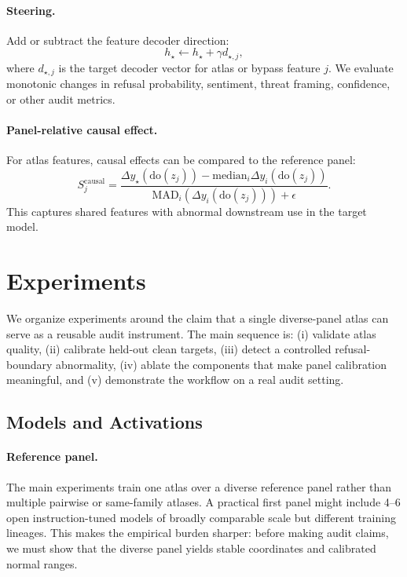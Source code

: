 \documentclass[11pt]{article}
\newcommand{\mad}{\mathrm{MAD}}
\begin{document}
\paragraph{Steering.}
Add or subtract the feature decoder direction:
\begin{equation}
    h_\star \leftarrow h_\star + \gamma d_{\star,j},
\end{equation}
where $d_{\star,j}$ is the target decoder vector for atlas or bypass feature $j$. We evaluate monotonic changes in refusal probability, sentiment, threat framing, confidence, or other audit metrics.

\paragraph{Panel-relative causal effect.}
For atlas features, causal effects can be compared to the reference panel:
\begin{equation}
    S^{\mathrm{causal}}_j=
    \frac{\Delta y_\star(\mathrm{do}(z_j))-\mathrm{median}_i\Delta y_i(\mathrm{do}(z_j))}{\mad_i(\Delta y_i(\mathrm{do}(z_j)))+\epsilon}.
\end{equation}
This captures shared features with abnormal downstream use in the target model.

\section{Experiments}

We organize experiments around the claim that a single diverse-panel atlas can serve as a reusable audit instrument. The main sequence is: (i) validate atlas quality, (ii) calibrate held-out clean targets, (iii) detect a controlled refusal-boundary abnormality, (iv) ablate the components that make panel calibration meaningful, and (v) demonstrate the workflow on a real audit setting.

\subsection{Models and Activations}

\paragraph{Reference panel.}
The main experiments train one atlas over a diverse reference panel rather than multiple pairwise or same-family atlases. A practical first panel might include 4--6 open instruction-tuned models of broadly comparable scale but different training lineages. This makes the empirical burden sharper: before making audit claims, we must show that the diverse panel yields stable coordinates and calibrated normal ranges.
\end{document}
